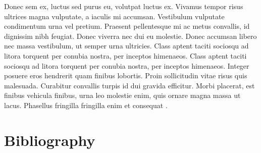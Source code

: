 \documentclass{thesis}
\begin{document}
Donec sem ex, luctus sed purus eu, volutpat luctus ex. Vivamus tempor risus ultrices magna vulputate, a iaculis mi accumsan. Vestibulum vulputate condimentum urna vel pretium. Praesent pellentesque mi ac metus convallis, id dignissim nibh feugiat. Donec viverra nec dui eu molestie. Donec accumsan libero nec massa vestibulum, ut semper urna ultricies. Class aptent taciti sociosqu ad litora torquent per conubia nostra, per inceptos himenaeos. Class aptent taciti sociosqu ad litora torquent per conubia nostra, per inceptos himenaeos. Integer posuere eros hendrerit quam finibus lobortis. Proin sollicitudin vitae risus quis malesuada. Curabitur convallis turpis id dui gravida efficitur. Morbi placerat, est finibus vehicula finibus, urna leo molestie enim, quis ornare magna massa ut lacus. Phasellus fringilla fringilla enim et consequat \cite{einstein}.

\newpage


\section{Bibliography}
\printbibliography[heading=none]
\end{document}

